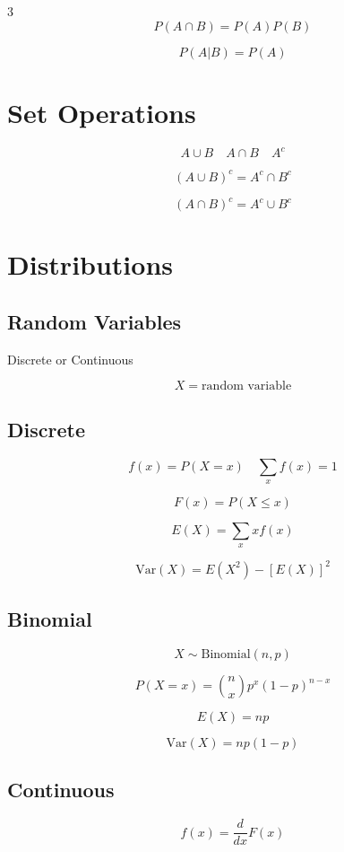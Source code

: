 \documentclass[10pt]{article}
\begin{document}
\begin{multicols}{3}
\[
P(A \cap B) = P(A)P(B)
\]

\[
P(A|B) = P(A)
\]

\section*{Set Operations}

\[
A \cup B
\quad
A \cap B
\quad
A^c
\]

\[
(A \cup B)^c = A^c \cap B^c
\]

\[
(A \cap B)^c = A^c \cup B^c
\]

\section*{Distributions}

\subsection*{Random Variables}

Discrete or Continuous

\[
X = \text{random variable}
\]

\subsection*{Discrete}

\[
f(x) = P(X = x)
\quad
\sum_x f(x) = 1
\]

\[
F(x) = P(X \le x)
\]

\[
E(X) = \sum_x x f(x)
\]

\[
\mathrm{Var}(X) = E(X^2) - [E(X)]^2
\]

\subsection*{Binomial}

\[
X \sim \mathrm{Binomial}(n, p)
\]

\[
P(X = x) = \binom{n}{x} p^x (1-p)^{n-x}
\]

\[
E(X) = np
\]

\[
\mathrm{Var}(X) = np(1-p)
\]

\subsection*{Continuous}

\[
f(x) = \frac{d}{dx}F(x)
\]


\end{multicols}
\end{document}
